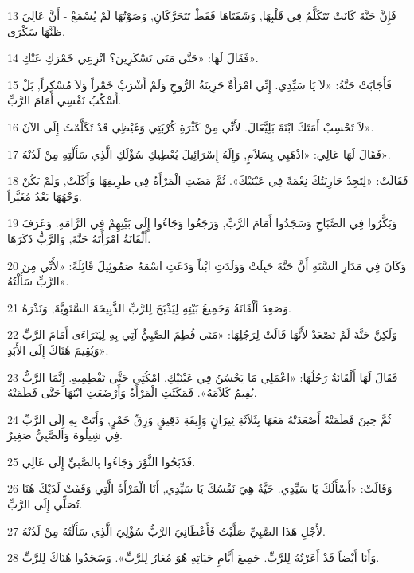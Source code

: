 \par 13 فَإِنَّ حَنَّةَ كَانَتْ تَتَكَلَّمُ فِي قَلْبِهَا, وَشَفَتَاهَا فَقَطْ تَتَحَرَّكَانِ, وَصَوْتُهَا لَمْ يُسْمَعْ - أَنَّ عَالِيَ ظَنَّهَا سَكْرَى.
\par 14 فَقَالَ لَهَا: «حَتَّى مَتَى تَسْكَرِينَ؟ انْزِعِي خَمْرَكِ عَنْكِ».
\par 15 فَأَجَابَتْ حَنَّةُ: «لاَ يَا سَيِّدِي. إِنِّي امْرَأَةٌ حَزِينَةُ الرُّوحِ وَلَمْ أَشْرَبْ خَمْراً وَلاَ مُسْكِراً, بَلْ أَسْكُبُ نَفْسِي أَمَامَ الرَّبِّ.
\par 16 لاَ تَحْسِبْ أَمَتَكَ ابْنَةَ بَلِيَّعَالَ. لأَنِّي مِنْ كَثْرَةِ كُرْبَتِي وَغَيْظِي قَدْ تَكَلَّمْتُ إِلَى الآنَ».
\par 17 فَقَالَ لَهَا عَالِي: «اذْهَبِي بِسَلاَمٍ, وَإِلَهُ إِسْرَائِيلَ يُعْطِيكِ سُؤْلَكِ الَّذِي سَأَلْتِهِ مِنْ لَدُنْهُ».
\par 18 فَقَالَتْ: «لِتَجِدْ جَارِيَتُكَ نِعْمَةً فِي عَيْنَيْكَ». ثُمَّ مَضَتِ الْمَرْأَةُ فِي طَرِيقِهَا وَأَكَلَتْ, وَلَمْ يَكُنْ وَجْهُهَا بَعْدُ مُغَيَّراً.
\par 19 وَبَكَّرُوا فِي الصَّبَاحِ وَسَجَدُوا أَمَامَ الرَّبِّ, وَرَجَعُوا وَجَاءُوا إِلَى بَيْتِهِمْ فِي الرَّامَةِ. وَعَرَفَ أَلْقَانَةُ امْرَأَتَهُ حَنَّةَ, وَالرَّبُّ ذَكَرَهَا.
\par 20 وَكَانَ فِي مَدَارِ السَّنَةِ أَنَّ حَنَّةَ حَبِلَتْ وَوَلَدَتِ ابْناً وَدَعَتِ اسْمَهُ صَمُوئِيلَ قَائِلَةً: «لأَنِّي مِنَ الرَّبِّ سَأَلْتُهُ».
\par 21 وَصَعِدَ أَلْقَانَةُ وَجَمِيعُ بَيْتِهِ لِيَذْبَحَ لِلرَّبِّ الذَّبِيحَةَ السَّنَوِيَّةَ, وَنَذْرَهُ.
\par 22 وَلَكِنَّ حَنَّةَ لَمْ تَصْعَدْ لأَنَّهَا قَالَتْ لِرَجُلِهَا: «مَتَى فُطِمَ الصَّبِيُّ آتِي بِهِ لِيَتَرَاءَى أَمَامَ الرَّبِّ وَيُقِيمَ هُنَاكَ إِلَى الأَبَدِ».
\par 23 فَقَالَ لَهَا أَلْقَانَةُ رَجُلُهَا: «اعْمَلِي مَا يَحْسُنُ فِي عَيْنَيْكِ. امْكُثِي حَتَّى تَفْطِمِيهِ. إِنَّمَا الرَّبُّ يُقِيمُ كَلاَمَهُ». فَمَكَثَتِ الْمَرْأَةُ وَأَرْضَعَتِ ابْنَهَا حَتَّى فَطَمَتْهُ.
\par 24 ثُمَّ حِينَ فَطَمَتْهُ أَصْعَدَتْهُ مَعَهَا بِثَلاَثَةِ ثِيرَانٍ وَإِيفَةِ دَقِيقٍ وَزِقِّ خَمْرٍ, وَأَتَتْ بِهِ إِلَى الرَّبِّ فِي شِيلُوهَ وَالصَّبِيُّ صَغِيرٌ.
\par 25 فَذَبَحُوا الثَّوْرَ وَجَاءُوا بِالصَّبِيِّ إِلَى عَالِي.
\par 26 وَقَالَتْ: «أَسْأَلُكَ يَا سَيِّدِي. حَيَّةٌ هِيَ نَفْسُكَ يَا سَيِّدِي, أَنَا الْمَرْأَةُ الَّتِي وَقَفَتْ لَدَيْكَ هُنَا تُصَلِّي إِلَى الرَّبِّ.
\par 27 لأَجْلِ هَذَا الصَّبِيِّ صَلَّيْتُ فَأَعْطَانِيَ الرَّبُّ سُؤْلِيَ الَّذِي سَأَلْتُهُ مِنْ لَدُنْهُ.
\par 28 وَأَنَا أَيْضاً قَدْ أَعَرْتُهُ لِلرَّبِّ. جَمِيعَ أَيَّامِ حَيَاتِهِ هُوَ مُعَارٌ لِلرَّبِّ». وَسَجَدُوا هُنَاكَ لِلرَّبِّ.

